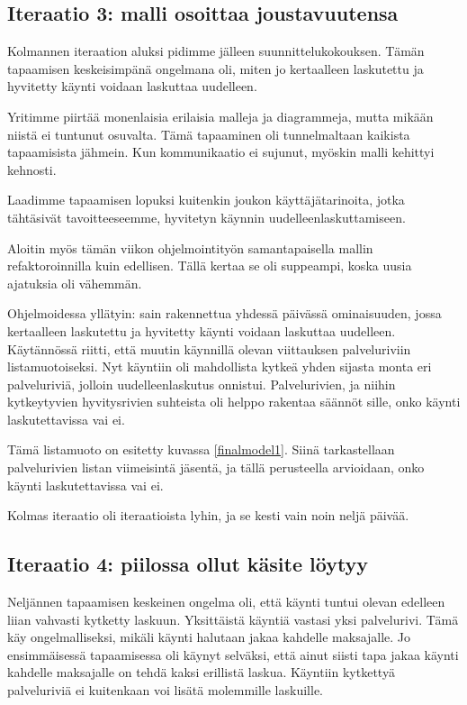 \hypertarget{iteraatio-3-malli-osoittaa-joustavuutensa}{%
\subsection{Iteraatio 3: malli osoittaa
joustavuutensa}\label{iteraatio-3-malli-osoittaa-joustavuutensa}}

Kolmannen iteraation aluksi pidimme jälleen suunnittelukokouksen. Tämän
tapaamisen keskeisimpänä ongelmana oli, miten jo kertaalleen laskutettu
ja hyvitetty käynti voidaan laskuttaa uudelleen.

Yritimme piirtää monenlaisia erilaisia malleja ja diagrammeja, mutta
mikään niistä ei tuntunut osuvalta. Tämä tapaaminen oli tunnelmaltaan
kaikista tapaamisista jähmein. Kun kommunikaatio ei sujunut, myöskin
malli kehittyi kehnosti.

Laadimme tapaamisen lopuksi kuitenkin joukon käyttäjätarinoita, jotka
tähtäsivät tavoitteeseemme, hyvitetyn käynnin uudelleenlaskuttamiseen.

Aloitin myös tämän viikon ohjelmointityön samantapaisella mallin
refaktoroinnilla kuin edellisen. Tällä kertaa se oli suppeampi, koska
uusia ajatuksia oli vähemmän.

Ohjelmoidessa yllätyin: sain rakennettua yhdessä päivässä ominaisuuden,
jossa kertaalleen laskutettu ja hyvitetty käynti voidaan laskuttaa
uudelleen. Käytännössä riitti, että muutin käynnillä olevan viittauksen
palveluriviin listamuotoiseksi. Nyt käyntiin oli mahdollista kytkeä
yhden sijasta monta eri palveluriviä, jolloin uudelleenlaskutus
onnistui. Palvelurivien, ja niihin kytkeytyvien hyvitysrivien suhteista
oli helppo rakentaa säännöt sille, onko käynti laskutettavissa vai ei.

Tämä listamuoto on esitetty kuvassa \ref{finalmodel1}. Siinä
tarkastellaan palvelurivien listan viimeisintä jäsentä, ja tällä
perusteella arvioidaan, onko käynti laskutettavissa vai ei.

Kolmas iteraatio oli iteraatioista lyhin, ja se kesti vain noin neljä
päivää.

\hypertarget{iteraatio-4-piilossa-ollut-kuxe4site-luxf6ytyy}{%
\subsection{Iteraatio 4: piilossa ollut käsite
löytyy}\label{iteraatio-4-piilossa-ollut-kuxe4site-luxf6ytyy}}

Neljännen tapaamisen keskeinen ongelma oli, että käynti tuntui olevan
edelleen liian vahvasti kytketty laskuun. Yksittäistä käyntiä vastasi
yksi palvelurivi. Tämä käy ongelmalliseksi, mikäli käynti halutaan jakaa
kahdelle maksajalle. Jo ensimmäisessä tapaamisessa oli käynyt selväksi,
että ainut siisti tapa jakaa käynti kahdelle maksajalle on tehdä kaksi
erillistä laskua. Käyntiin kytkettyä palveluriviä ei kuitenkaan voi
lisätä molemmille laskuille.

